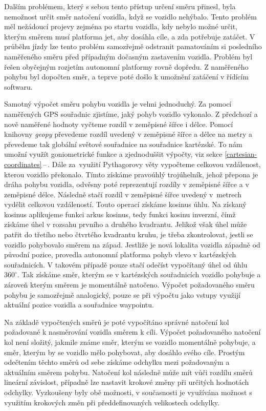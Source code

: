 \documentclass[czech, bachelor]{diploma}
\newcommand{\filipref}[1]{\ref{#1}\,--\,\nameref{#1}}
\begin{document}
Dalším problémem, který s sebou tento přístup určení směru přinesl, byla nemožnost určit směr natočení vozidla, když se vozidlo
nehýbalo. Tento problém měl nežádoucí projevy zejména po startu vozidla, kdy nebylo možné určit, kterým směrem musí platforma jet,
aby dosáhla cíle, a zda potřebuje zatáčet. V průběhu jízdy lze tento problém samozřejmě odstranit pamatováním si posledního
naměřeného směru před případným dočasným zastavením vozidla. Problém byl řešen obyčejným rozjetím autonomní platformy rovně
dopředu. Z naměřeného pohybu byl dopočten směr, a teprve poté došlo k umožnění zatáčení v řídícím softwaru.

Samotný výpočet směru pohybu vozidla je velmi jednoduchý. Za pomocí naměřených GPS souřadnic zjistíme, jaký pohyb vozidlo
vykonalo. Z předchozí a nově naměřené hodnoty vyčteme rozdíl v zeměpisné šířce i délce. Pomocí knihovny \emph{geopy} převedeme
rozdíl uvedený v zeměpisné šířce a délce na metry a převedeme tak globální světové souřadnice na souřadnice kartézské. To nám
umožní využít goniometrické funkce a zjednoduššit výpočty, viz sekce \filipref{cartesian-coordinates}. Dále za~využití Pythagorovy
věty vypočteme celkovou vzdálenost, kterou vozidlo překonalo. Tímto získáme pravoúhlý trojúhelník, jehož přepona je dráha
pohybu vozidla, odvěsny poté reprezentují rozdíly v zeměpisné šířce a v zeměpisné délce. Následně stačí rozdíl v zeměpisné šířce
uvedený v~metrech vydělit celkovou vzdáleností. Touto operací získáme kosinus úhlu. Na získaný kosinus aplikujeme funkci arkus
kosinus, tedy funkci kosinu inverzní, čímž získáme úhel v rozsahu prvního a druhého kvadrantu. Jelikož však úhel může patřit do
třetího nebo čtvrtého kvadrantu kruhu, je třeba zkontrolovat, jestli se vozidlo pohybovalo směrem na západ. Jestliže je nová
lokalita vozidla západně od původní pozice, provedla autonomní platforma pohyb vlevo v kartézských souřadnicích. V takovém případě
pouze stačí odečíst vypočítaný úhel od úhlu $360^{\circ}$. Tak získáme směr, kterým se v kartézských souřadnicích vozidlo pohybuje
a zároveň kterým směrem je momentálně natočeno. Výpočet požadovaného směru pohybu je samozřejmě analogický, pouze se při výpočtu
jako vstupy využijí aktuální pozice vozidla a souřadnice waypointu.

Na základě vypočtených směrů je poté vypočítáno správné natočení kol požadované k nasměrování vozidla směrem k cíli. Výpočet
požadovaného natočení kol není složitý, jakmile známe směr, kterým se vozidlo momentálně pohybuje, a směr, kterým by se vozidlo
mělo pohybovat, aby dosáhlo svého cíle. Prostým odečtením těchto směrů od sebe získáme odchylku mezi požadovaným a aktuálním
směrem pohybu. Natočení kol následně může mít vůči rozdílu směrů lineární závislost, případně lze nastavit krokové změny
při určitých hodnotách odchylky. Vyzkoušeny byly obě možnosti, v současnosti je využívána možnost s využitím krokových změn při
předdefinovaných velikostech odchylky.
\end{document}
